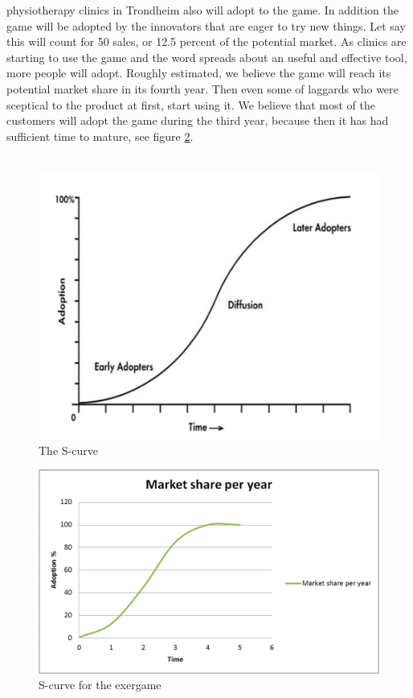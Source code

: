 physiotherapy clinics in Trondheim also will adopt to the game. In addition the game will be adopted by the innovators that are eager to try new things. Let say this will count for 50 sales, or 12.5 percent of the potential market. As clinics are starting to use the game and the word spreads about an useful and effective tool, more people will adopt. Roughly estimated, we believe the game will reach its potential market share in its fourth year. Then even some of laggards who were sceptical to the product at first, start using it. We believe that most of the customers will adopt the game during the third year, because then it has had sufficient time to mature, see figure \ref{fig:scurve2}. \\ \\ 
\begin{figure}
\begin{center}
\includegraphics[scale=0.4]{scurve}
\caption[The S-curve]{The S-curve \cite{scurve}}
\label{fig:scurve}
\end{center}
\end{figure}
\begin{figure}
\begin{center}
\includegraphics[scale=0.5]{scurve2}
\caption[The S-curve]{S-curve for the exergame}
\label{fig:scurve2}
\end{center}
\end{figure}
